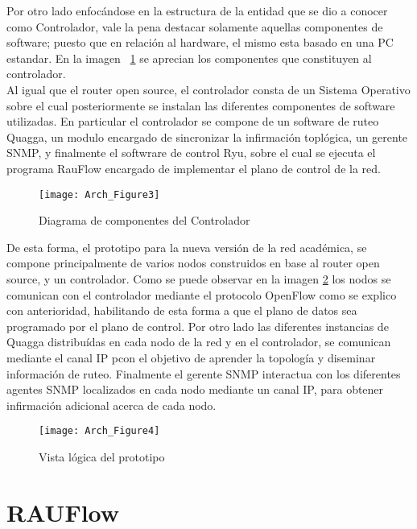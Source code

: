\newpage
Por otro lado enfoc\'andose en la estructura de la entidad que se dio a conocer como Controlador, vale la pena destacar solamente aquellas componentes de software; puesto que en relaci\'on al hardware, el mismo esta basado en una PC estandar. En la imagen ~\ref{fig:OpenSourceRArch3} se aprecian los componentes que constituyen al controlador.\\

Al igual que el router open source, el controlador consta de un Sistema Operativo sobre el cual posteriormente se instalan las diferentes componentes de software utilizadas. En particular el controlador se compone de un software de ruteo Quagga, un modulo encargado de sincronizar la infirmaci\'on topl\'ogica, un gerente SNMP, y finalmente el softwrare de control Ryu, sobre el cual se ejecuta el programa RauFlow encargado de implementar el plano de control de la red.

\begin{figure}[htbp!] 
\centering    
\texttt{[image: Arch\_Figure3]}
\caption[OpenSourceRArch3]{Diagrama de componentes del Controlador}
\label{fig:OpenSourceRArch3}
\end{figure}

De esta forma, el prototipo para la nueva versi\'on de la red acad\'emica, se compone principalmente de varios nodos construidos en base al router open source, y un controlador. Como se puede observar en la imagen \ref{fig:OpenSourceRArch4} los nodos se comunican con el controlador mediante el protocolo OpenFlow como se explico con anterioridad, habilitando de esta forma a que el plano de datos sea programado por el plano de control. Por otro lado las diferentes instancias de Quagga distribu\'idas en cada nodo de la red y en el controlador, se comunican mediante el canal IP pcon el objetivo de aprender la topolog\'ia y diseminar informaci\'on de ruteo. Finalmente el gerente SNMP interactua con los diferentes agentes SNMP localizados en cada nodo mediante un canal IP, para obtener infirmaci\'on adicional acerca de cada nodo. 

\begin{figure}[htbp!] 
\centering    
\texttt{[image: Arch\_Figure4]}
\caption[OpenSourceRArch4]{Vista l\'ogica del prototipo}
\label{fig:OpenSourceRArch4}
\end{figure}

\section[RAUFlow]{RAUFlow}

